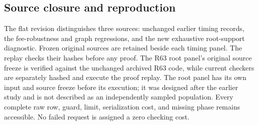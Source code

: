 \documentclass[11pt,letterpaper]{article}
\theoremstyle{definition}\newtheorem{remark}[theorem]{Remark}
\begin{document}
\subsection{Source closure and reproduction}
The flat revision distinguishes three sources: unchanged earlier timing records, the fee-robustness and graph regressions, and the new exhaustive root-support diagnostic. Frozen original sources are retained beside each timing panel. The replay checks their hashes before any proof. The R63 root panel's original source freeze is verified against the unchanged archived R63 code, while current checkers are separately hashed and execute the proof replay. The root panel has its own input and source freeze before its execution; it was designed after the earlier study and is not described as an independently sampled population. Every complete raw row, guard, limit, serialization cost, and missing phase remains accessible. No failed request is assigned a zero checking cost.
\end{document}
